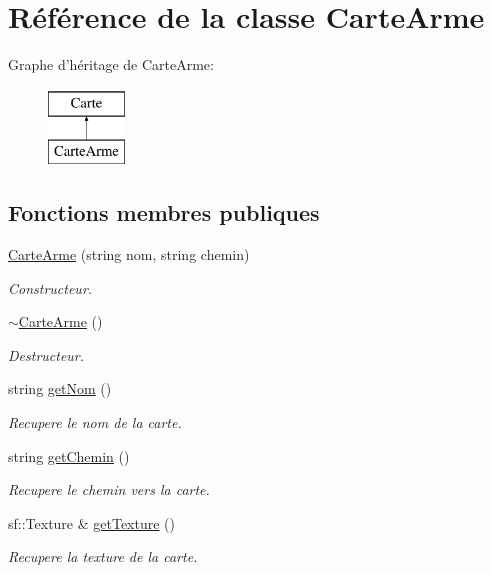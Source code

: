 \hypertarget{classCarteArme}{\section{\-Référence de la classe \-Carte\-Arme}
\label{classCarteArme}
}
\-Graphe d'héritage de \-Carte\-Arme\-:\begin{figure}[H]
\begin{center}
\leavevmode
\includegraphics[height=2.000000cm]{classCarteArme}
\end{center}
\end{figure}
\subsection*{\-Fonctions membres publiques}
\begin{DoxyCompactItemize}
\item 
\hypertarget{classCarteArme_a082dcec4de4674cfc6386327dad23d2d}{\hyperlink{classCarteArme_a082dcec4de4674cfc6386327dad23d2d}{\-Carte\-Arme} (string nom, string chemin)}\label{classCarteArme_a082dcec4de4674cfc6386327dad23d2d}

\begin{DoxyCompactList}\small\item\em \-Constructeur. \end{DoxyCompactList}\item 
\hypertarget{classCarteArme_aa2592d81cea11137034648f2ab90260a}{\hyperlink{classCarteArme_aa2592d81cea11137034648f2ab90260a}{$\sim$\-Carte\-Arme} ()}\label{classCarteArme_aa2592d81cea11137034648f2ab90260a}

\begin{DoxyCompactList}\small\item\em \-Destructeur. \end{DoxyCompactList}\item 
string \hyperlink{classCarteArme_a8f736d4e8448d65c57ce589ffb32e68d}{get\-Nom} ()
\begin{DoxyCompactList}\small\item\em \-Recupere le nom de la carte. \end{DoxyCompactList}\item 
string \hyperlink{classCarteArme_a44c430169a967b9d825644b328e03c3f}{get\-Chemin} ()
\begin{DoxyCompactList}\small\item\em \-Recupere le chemin vers la carte. \end{DoxyCompactList}\item 
sf\-::\-Texture \& \hyperlink{classCarteArme_ab0b8bfe3079c3565ccedd18a32f5c6a6}{get\-Texture} ()
\begin{DoxyCompactList}\small\item\em \-Recupere la texture de la carte. \end{DoxyCompactList}\end{DoxyCompactItemize}


